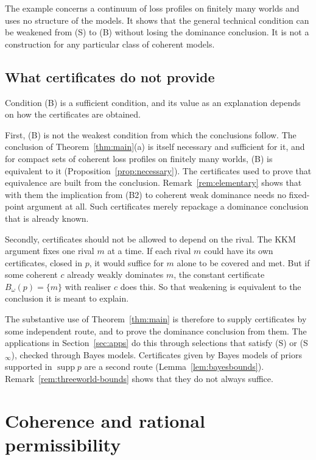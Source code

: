 \documentclass[11pt]{article}
\theoremstyle{definition}
\theoremstyle{remark}
\newcommand{\supp}{\operatorname{supp}}
\begin{document}
The example concerns a continuum of loss profiles on finitely many worlds and uses no structure of the models. It shows that the general technical condition can be weakened from (S) to (B) without losing the dominance conclusion. It is not a construction for any particular class of coherent models.

\subsection{What certificates do not provide}\label{sec:limits}
Condition (B) is a sufficient condition, and its value as an explanation depends on how the certificates are obtained.

First, (B) is not the weakest condition from which the conclusions follow. The conclusion of Theorem~\ref{thm:main}(a) is itself necessary and sufficient for it, and for compact sets of coherent loss profiles on finitely many worlds, (B) is equivalent to it (Proposition~\ref{prop:necessary}). The certificates used to prove that equivalence are built from the conclusion. Remark~\ref{rem:elementary} shows that with them the implication from (B2) to coherent weak dominance needs no fixed-point argument at all. Such certificates merely repackage a dominance conclusion that is already known.

Secondly, certificates should not be allowed to depend on the rival. The KKM argument fixes one rival $m$ at a time. If each rival $m$ could have its own certificates, closed in $p$, it would suffice for $m$ alone to be covered and met. But if some coherent $c$ already weakly dominates $m$, the constant certificate $B_\omega(p)=\{m\}$ with realiser $c$ does this. So that weakening is equivalent to the conclusion it is meant to explain.

The substantive use of Theorem~\ref{thm:main} is therefore to supply certificates by some independent route, and to prove the dominance conclusion from them. The applications in Section~\ref{sec:apps} do this through selections that satisfy (S) or (S$_\infty$), checked through Bayes models. Certificates given by Bayes models of priors supported in $\supp p$ are a second route (Lemma~\ref{lem:bayesbounds}). Remark~\ref{rem:threeworld-bounds} shows that they do not always suffice.

\section{Coherence and rational permissibility}\label{sec:argument}
\end{document}
